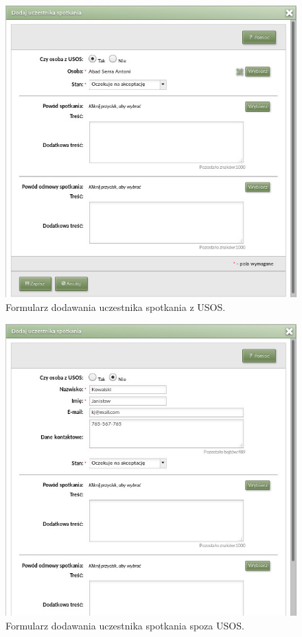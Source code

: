 \documentclass[licencjacka]{pracamgr}
\begin{document}
\begin{figure}[!]
  \includegraphics[width=\linewidth]{formularz_uczestnikow_USOS.jpg}
  \caption{Formularz dodawania uczestnika spotkania z USOS.}
  \label{fig:kalenformuczusosadm}
\end{figure}

\begin{figure}[!]
  \includegraphics[width=\linewidth]{formularz_uczestnikow_nieUSOS.jpg}
  \caption{Formularz dodawania uczestnika spotkania spoza USOS.}
  \label{fig:kalenformucznieusosadm}
\end{figure}
\end{document}
